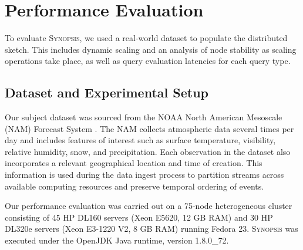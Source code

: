\section{Performance Evaluation}
\label{sec:performance}
To evaluate \textsc{Synopsis}, we used a real-world dataset to populate the distributed sketch. This includes dynamic scaling and an analysis of node stability as scaling operations take place, as well as query evaluation latencies for each query type.

\subsection{Dataset and Experimental Setup}
Our subject dataset was sourced from the NOAA North American Mesoscale (NAM) Forecast System \cite{noaa_nam}.  The NAM collects atmospheric data several times per day and includes features of interest such as surface temperature, visibility, relative humidity, snow, and precipitation. Each observation in the dataset also incorporates a relevant geographical location and time of creation. This information is used during the data ingest process to partition streams across available computing resources and preserve temporal ordering of events.

Our performance evaluation was carried out on a 75-node heterogeneous cluster consisting of 45 HP DL160 servers (Xeon E5620, 12 GB RAM) and 30 HP DL320e servers (Xeon E3-1220 V2, 8 GB RAM) running Fedora 23. \textsc{Synopsis} was executed under the OpenJDK Java runtime, version 1.8.0\_72.

